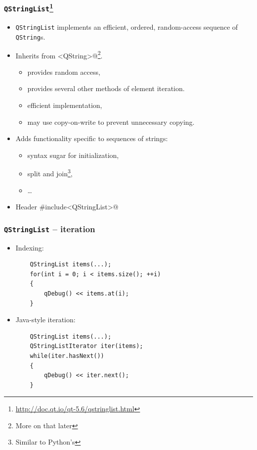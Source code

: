 \begin{frame}[fragile]
  \frametitle{\texttt{QStringList}\footnote
    {\url{http://doc.qt.io/qt-5.6/qstringlist.html}}}
  \begin{itemize}
    \item \texttt{QStringList} implements an efficient, ordered, random-access
    sequence of \texttt{QString}s.
    \item Inherits from \verb@QList<QString>@\footnote{More on that later}.
    \begin{itemize}
      \item provides random access,
      \item provides several other methods of element iteration.
      \item efficient implementation,
      \item may use copy-on-write to prevent unnecessary copying.
    \end{itemize}
    \item Adds functionality specific to sequences of strings:
    \begin{itemize}
      \item syntax sugar for initialization,
      \item split and join\footnote{Similar to Python's},
      \item \ldots
    \end{itemize}
    \item Header \verb@#include<QStringList>@
  \end{itemize}
\end{frame}

\begin{frame}[fragile]
  \frametitle{\texttt{QStringList} -- iteration}
  \small
  \begin{itemize}
    \item Indexing:
     \begin{lstlisting}
	QStringList items(...); 
	for(int i = 0; i < items.size(); ++i)
	{
	    qDebug() << items.at(i);
	}
     \end{lstlisting}
    \item Java-style iteration:
     \begin{lstlisting}
	QStringList items(...); 
	QStringListIterator iter(items);
	while(iter.hasNext())
	{
	    qDebug() << iter.next();
	}
     \end{lstlisting}
  \end{itemize}
\end{frame}

